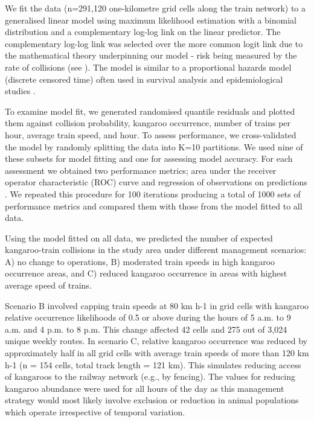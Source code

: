 We fit the data (n=291,120 one-kilometre grid cells along the train network) to a generalised linear model \citep{mccu89} using maximum likelihood estimation with a binomial distribution and a complementary log-log link on the linear predictor.  The complementary log-log link was selected over the more common logit link due to the mathematical theory underpinning our model - risk being measured by the rate of collisions (see ).  The model is similar to a proportional hazards model (discrete censored time) often used in survival analysis and epidemiological studies \citep{cox84}.

To examine model fit, we generated randomised quantile residuals \citep{dunn96} and plotted them against collision probability, kangaroo occurrence, number of trains per hour, average train speed, and hour. To assess performance, we cross-validated the model by randomly splitting the data into K=10 partitions. We used nine of these subsets for model fitting and one for assessing model accuracy.  For each assessment we obtained two performance metrics; area under the receiver operator characteristic (ROC) curve \citep{metz78} and regression of observations on predictions \citep{cox89,mill91}. We repeated this procedure for 100 iterations producing a total of 1000 sets of performance metrics and compared them with those from the model fitted to all data.

Using the model fitted on all data, we predicted the number of expected kangaroo-train collisions in the study area under different management scenarios: 
A) no change to operations, 
B) moderated train speeds in high kangaroo occurrence areas, and 
C) reduced kangaroo occurrence in areas with highest average speed of trains.

Scenario B involved capping train speeds at 80 km h-1 in grid cells with kangaroo relative occurrence likelihoods of 0.5 or above during the hours of 5 a.m. to 9 a.m. and 4 p.m. to 8 p.m.  This change affected 42 cells and 275 out of 3,024 unique weekly routes.  In scenario C, relative kangaroo occurrence was reduced by approximately half in all grid cells with average train speeds of more than 120 km h-1 (n = 154 cells, total track length = 121 km). This simulates reducing access of kangaroos to the railway network (e.g., by fencing).  The values for reducing kangaroo abundance were used for all hours of the day as this management strategy would most likely involve exclusion or reduction in animal populations which operate irrespective of temporal variation.


